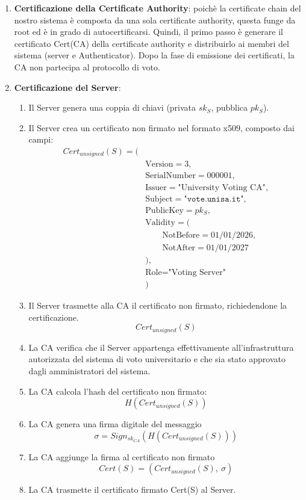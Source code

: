 \begin{enumerate}
	\item \textbf{Certificazione della Certificate Authority}: poichè la certificate chain del nostro sistema è composta da una sola certificate authority, questa funge da root ed è in grado di autocertificarsi. Quindi, il primo passo è generare il certificato Cert(CA) della certificate authority e distribuirlo ai membri del sistema (server e Authenticator). Dopo la fase di emissione dei certificati, la CA non partecipa al protocollo di voto.
	\item \textbf{Certificazione del Server}: 
		\begin{enumerate}
			\item Il Server genera una coppia di chiavi (privata $sk_S$, pubblica $pk_S$).
			\item Il Server crea un certificato non firmato nel formato x509, composto dai campi:
			$$
			\begin{aligned}
				Cert_{unsigned}(S) = (& \\
				&\text{Version} = 3, \\
				&\text{SerialNumber} = 000001, \\
				&\text{Issuer} = \text{"University Voting CA"}, \\
				&\text{Subject} = \texttt{"vote.unisa.it"}, \\
				&\text{PublicKey} = pk_S, \\
				&\text{Validity} = ( \\
				&\qquad \text{NotBefore} = 01/01/2026, \\
				&\qquad \text{NotAfter} = 01/01/2027 \\
				&), \\
				&\text{Role} = \text{"Voting Server"} \\
				&)
			\end{aligned}
			$$
			\item Il Server trasmette alla CA il certificato non firmato, richiedendone la certificazione. $$Cert_{unsigned}(S)$$
			\item La CA verifica che il Server appartenga effettivamente all’infrastruttura autorizzata del sistema di voto universitario e che sia stato approvato dagli amministratori del sistema. 
			\item La CA calcola l'hash del certificato non firmato: $$H(Cert_{unsigned}(S))$$
			\item La CA genera una firma digitale del messaggio $$\sigma=Sign_{sk_{CA}}(H(Cert_{unsigned}(S)))$$
			\item La CA aggiunge la firma al certificato non firmato $$Cert(S)=(Cert_{unsigned}(S),\ \sigma)$$
			\item La CA trasmette il certificato firmato Cert(S) al Server.
		\end{enumerate}
		

\end{enumerate}
